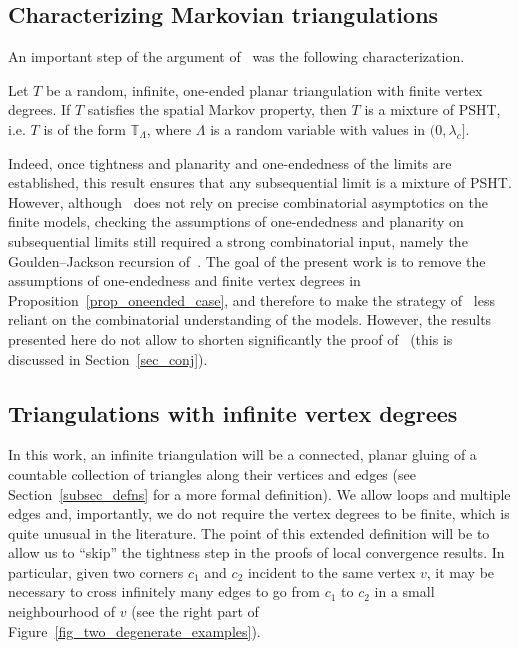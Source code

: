 \documentclass[10pt]{amsart}
\theoremstyle{definition}\newtheorem{defi}[theo]{Definition}\newtheorem{rema}[theo]{Remark}\newtheorem{exam}[theo]{Example}\newtheorem{exem}[theo]{Example}\newtheorem{nota}[theo]{Notation}
\newcommand{\TT}{\mathbb{T}}
\begin{document}
\subsection*{Characterizing Markovian triangulations}
An important step of the argument of~\cite{BL19} was the following characterization.

\begin{prop}
\cite[Theorem~2]{BL19}\label{prop_oneended_case}
Let $T$ be a random, infinite, one-ended planar triangulation with finite vertex degrees. If $T$ satisfies the spatial Markov property, then $T$ is a mixture of PSHT, i.e. $T$ is of the form $\TT_{\Lambda}$, where $\Lambda$ is a random variable with values in $(0,\lambda_c]$.
\end{prop}

Indeed, once tightness and planarity and one-endedness of the limits are established, this result ensures that any subsequential limit is a mixture of PSHT. However, although~\cite{BL19} does not rely on precise combinatorial asymptotics on the finite models, checking the assumptions of one-endedness and planarity on subsequential limits still required a strong combinatorial input, namely the Goulden--Jackson recursion of~\cite{GJ08}. The goal of the present work is to remove the assumptions of one-endedness and finite vertex degrees in Proposition~\ref{prop_oneended_case}, and therefore to make the strategy of~\cite{BL19} less reliant on the combinatorial understanding of the models. However, the results presented here do not allow to shorten significantly the proof of~\cite{BL19} (this is discussed in Section~\ref{sec_conj}).

\subsection*{Triangulations with infinite vertex degrees}
In this work, an infinite triangulation will be a connected, planar gluing of a countable collection of triangles along their vertices and edges (see Section~\ref{subsec_defns} for a more formal definition). We allow loops and multiple edges and, importantly, we do not require the vertex degrees to be finite, which is quite unusual in the literature. The point of this extended definition will be to allow us to ``skip'' the tightness step in the proofs of local convergence results. In particular, given two corners $c_1$ and $c_2$ incident to the same vertex $v$, it may be necessary to cross infinitely many edges to go from $c_1$ to $c_2$ in a small neighbourhood of $v$ (see the right part of Figure~\ref{fig_two_degenerate_examples}).
\end{document}
